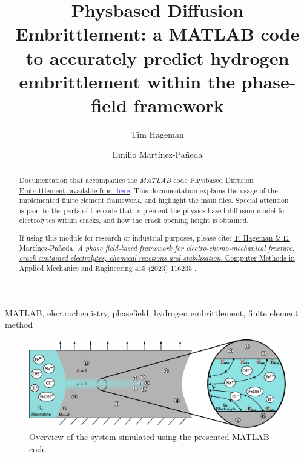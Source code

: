 \documentclass[3p]{elsarticle} %
\newcommand{\citeMe}{\href{https://doi.org/10.1016/j.cma.2023.116235}{T. Hageman \& E. Martínez-Pañeda, \textit{A phase field-based framework for electro-chemo-mechanical fracture: crack-contained electrolytes, chemical reactions and stabilisation}. Computer Methods in Applied Mechanics and Engineering 415 (2023) 116235} \citep{Hageman2023}}
\begin{document}
\begin{frontmatter}
\title{Physbased Diffusion Embrittlement: a MATLAB code to accurately predict hydrogen embrittlement within the phase-field framework}

\author{Tim Hageman }
\author{Emilio Martínez-Pañeda}

\address{Department of Civil and Environmental Engineering, Imperial College London, London SW7 2AZ, UK}

\begin{abstract}
Documentation that accompanies the \textit{MATLAB} code \href{https://github.com/T-Hageman/PhysBased_Diffusion_Embrittlement}{Physbased Diffusion Embrittlement, available from \textcolor{blue}{here}}. This documentation explains the usage of the implemented finite element framework, and highlight the main files. Special attention is paid to the parts of the code that implement the physics-based diffusion model for electrolytes within cracks, and how the crack opening height is obtained. 

If using this module for research or industrial purposes, please cite: \citeMe{}.
\end{abstract}

\begin{keyword}
MATLAB, electrochemistry, phasefield, hydrogen embrittlement, finite element method
\end{keyword}

\end{frontmatter}

\begin{figure}
	\centering
	\includegraphics[width=16cm]{Figures/Generic_Domain_DOFs.eps}
	\caption{Overview of the system simulated using the presented MATLAB code}
\end{figure}

\tableofcontents
\end{document}
